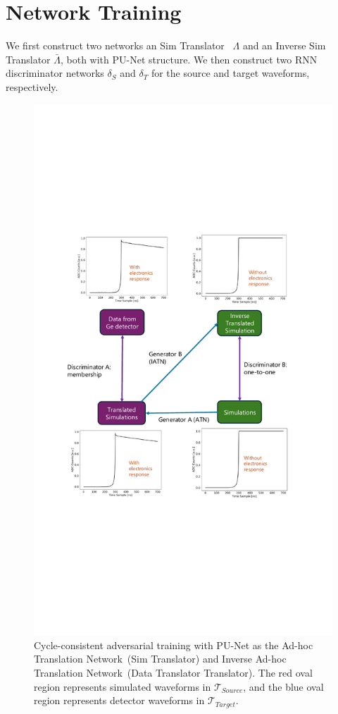 \section{Network Training}

We first construct two networks an Sim Translator~ $\Lambda$ and an Inverse Sim Translator $\bar{\Lambda}$, both with PU-Net structure. We then construct two RNN discriminator networks $\delta_{S}$ and $\delta_{T}$ for the source and target waveforms, respectively. 
\clearpage
\begin{figure}[htb!]
    \includegraphics[width=0.99\linewidth,trim={5pc 20pc 6.5pc 19pc},clip]{ch7/figs/cycle_gan_training.pdf}
    \caption{Cycle-consistent adversarial training with PU-Net as the Ad-hoc Translation Network~(Sim Translator) and Inverse Ad-hoc Translation Network~(Data Translator Translator). The red oval region represents simulated waveforms in $\mathcal{T}_{Source}$, and the blue oval region represents detector waveforms in $\mathcal{T}_{Target}$.}
   \label{fig:network_training}
\end{figure}

